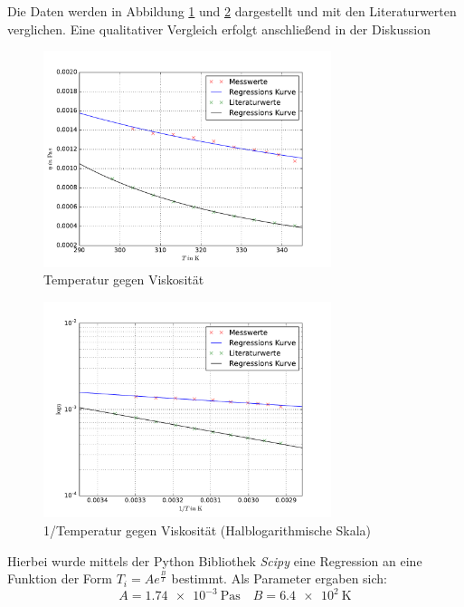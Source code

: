 Die Daten werden in Abbildung \ref{fig:t_v_v} und \ref{fig:t_v_l_v} dargestellt und mit den Literaturwerten verglichen. Eine qualitativer Vergleich erfolgt anschließend in der Diskussion
\FloatBarrier
\begin{figure}
\centering
\includegraphics[width=0.75\textwidth]{pics/viskositaet_temp_mit_lit.pdf}
\caption{Temperatur gegen Viskosität}
\label{fig:t_v_v}
\end{figure}

\begin{figure}
\centering
\includegraphics[width=0.75\textwidth]{pics/viskositaet_temp__log_mit_lit.pdf}
\caption{1/Temperatur gegen Viskosität (Halblogarithmische Skala)} %
\label{fig:t_v_l_v}
\end{figure}
\FloatBarrier

Hierbei wurde mittels der Python Bibliothek \emph{Scipy} eine %
Regression an eine Funktion der Form $T_i = Ae^{\frac{B}{T}}$ bestimmt.
Als Parameter ergaben sich:
\begin{equation*}
A=\SI{1.74e-3}{\pascal\second}\quad B=\SI{6.4e2}{\kelvin} %
\end{equation*}

